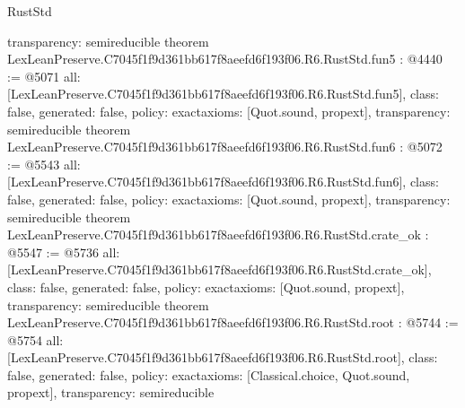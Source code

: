 \begin{lexlean}{RustStd}
\begin{coremodule}
{  transparency: semireducible
}
theorem LexLeanPreserve.C7045f1f9d361bb617f8aeefd6f193f06.R6.RustStd.fun5 : @4440 := @5071 {
  all: [LexLeanPreserve.C7045f1f9d361bb617f8aeefd6f193f06.R6.RustStd.fun5],
  class: false,
  generated: false,
  policy: exact{axioms: [Quot.sound, propext]},
  transparency: semireducible
}
theorem LexLeanPreserve.C7045f1f9d361bb617f8aeefd6f193f06.R6.RustStd.fun6 : @5072 := @5543 {
  all: [LexLeanPreserve.C7045f1f9d361bb617f8aeefd6f193f06.R6.RustStd.fun6],
  class: false,
  generated: false,
  policy: exact{axioms: [Quot.sound, propext]},
  transparency: semireducible
}
theorem LexLeanPreserve.C7045f1f9d361bb617f8aeefd6f193f06.R6.RustStd.crate_ok : @5547 := @5736 {
  all: [LexLeanPreserve.C7045f1f9d361bb617f8aeefd6f193f06.R6.RustStd.crate_ok],
  class: false,
  generated: false,
  policy: exact{axioms: [Quot.sound, propext]},
  transparency: semireducible
}
theorem LexLeanPreserve.C7045f1f9d361bb617f8aeefd6f193f06.R6.RustStd.root : @5744 := @5754 {
  all: [LexLeanPreserve.C7045f1f9d361bb617f8aeefd6f193f06.R6.RustStd.root],
  class: false,
  generated: false,
  policy: exact{axioms: [Classical.choice, Quot.sound, propext]},
  transparency: semireducible
}


\end{coremodule}
\end{lexlean}
